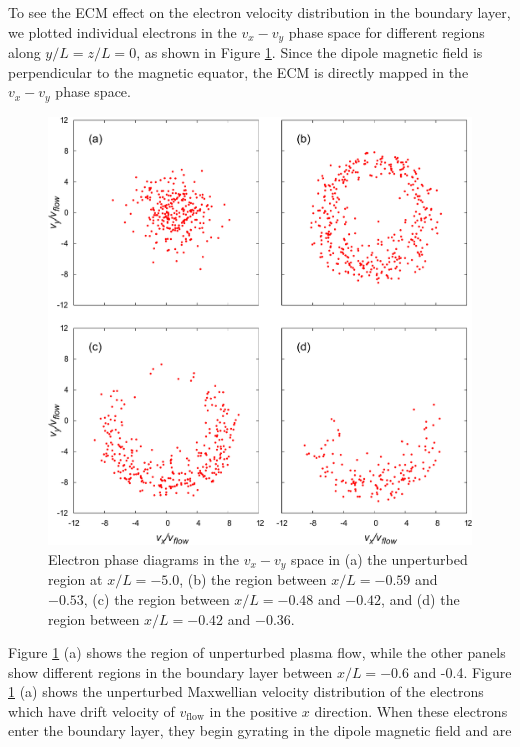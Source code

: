 \documentclass[draft,jgrga]{agutex2015}
\begin{document}
\begin{article}
To see the ECM effect on the electron velocity distribution in the boundary layer, 
we plotted individual electrons in the $v_x-v_y$ phase space 
for different regions along $y/L=z/L=0$, as shown in Figure \ref{fig:10}.
Since the dipole magnetic field is perpendicular to the magnetic equator, 
the ECM is directly mapped in the $v_x-v_y$ phase space.
\begin{figure}
\centering
\noindent\includegraphics[width=15cm]{./figures/Fig_10_bb-crop.pdf}
\caption{
Electron phase diagrams in the $v_{x}-v_{y}$ space in 
(a) the unperturbed region at $x/L = -5.0$, 
(b) the region between $x/L =-0.59$ and $-0.53$,  
(c) the region between $x/L =-0.48$ and $-0.42$, and
(d) the region between $x/L =-0.42$ and $-0.36$.
}
\label{fig:10}
\end{figure}
Figure \ref{fig:10} (a) shows the region of 
unperturbed plasma flow, while the other panels
show different regions in the boundary layer between $x/L = -0.6$ and -0.4.
Figure \ref{fig:10} (a) shows the unperturbed Maxwellian velocity distribution of the electrons
which have drift velocity of $v_{\mathrm{flow}}$ in the positive $x$ direction.
%
When these electrons enter the boundary layer, 
they begin gyrating in the dipole magnetic field and are

\end{article}
\end{document}
